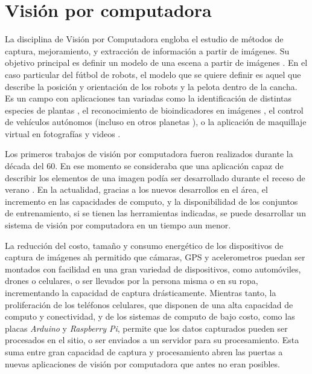 
\section{Visión por computadora}

La disciplina de Visión por Computadora engloba el estudio de métodos de
captura, mejoramiento, y extracción de información a partir de imágenes. Su
objetivo principal es definir un modelo de una escena a partir de imágenes
\cite{cvLinda2001}. En el caso particular del fútbol de robots, el modelo que se
quiere definir es aquel que describe la posición y orientación de los robots y
la pelota dentro de la cancha. Es un campo con aplicaciones tan variadas como la
identificación de distintas especies de plantas
\cite{plantIdentificacionUCVT2018}, el reconocimiento de bioindicadores en
imágenes \cite{anurosEmImagm2016}, el control de vehículos autónomos
\cite{e2eLearning4SDC} (incluso en otros planetas
\cite{twoYearsMarsRovers2007}), o la aplicación de maquillaje virtual en
fotografías y videos \cite{virtualMakeup2015}.

Los primeros trabajos de visión por computadora fueron realizados durante la
década del 60. En ese momento se consideraba que una aplicación capaz de
describir los elementos de una imagen podía ser desarrollado durante el receso
de verano \cite{summerVisionProject1966}. En la actualidad, gracias a los nuevos
desarrollos en el área, el incremento en las capacidades de computo, y la
disponibilidad de los conjuntos de entrenamiento, si se tienen las herramientas
indicadas, se puede desarrollar un sistema de visión por computadora en un
tiempo aun menor.

La reducción del costo, tamaño y consumo energético de los dispositivos de
captura de imágenes ah permitido que cámaras, GPS y acelerometros puedan ser
montados con facilidad en una gran variedad de dispositivos, como automóviles,
drones o celulares, o ser llevados por la persona misma o en su ropa,
incrementando la capacidad de captura drásticamente. Mientras tanto, la
proliferación de los teléfonos celulares, que disponen de una alta capacidad de
computo y conectividad, y de los sistemas de computo de bajo costo, como las
placas \emph{Arduino} y \emph{Raspberry Pi}, permite que los datos capturados
pueden ser procesados en el sitio, o ser enviados a un servidor para su
procesamiento. Esta suma entre gran capacidad de captura y procesamiento abren
las puertas a nuevas aplicaciones de visión por computadora que antes no eran
posibles.

